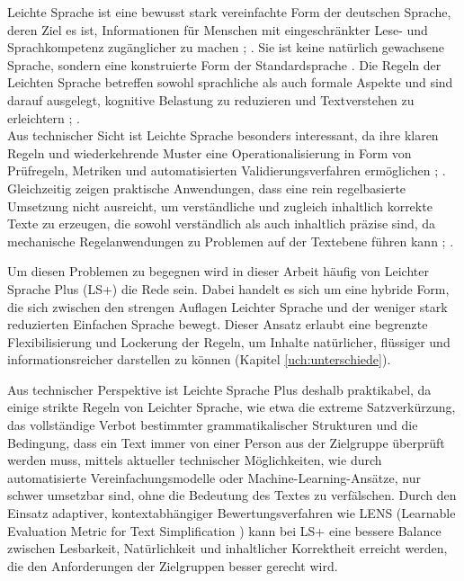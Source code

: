 
Leichte Sprache ist eine bewusst stark vereinfachte Form der deutschen Sprache, deren Ziel es ist, Informationen für Menschen mit eingeschränkter Lese- und Sprachkompetenz zugänglicher zu machen \cite{DINSPEC334292019}; \cite[S. 1]{maas_leichte_2015}.
Sie ist keine natürlich gewachsene Sprache, sondern eine konstruierte Form der Standardsprache \cite[S. 12]{maas_leichte_2015}.
Die Regeln der Leichten Sprache betreffen sowohl sprachliche als auch formale Aspekte und sind darauf ausgelegt, kognitive Belastung zu reduzieren und Textverstehen zu erleichtern \cite[S. 11-14]{maas_leichte_2015}; \cite[S. 251]{maas_handbuch_2018}.\\
Aus technischer Sicht ist Leichte Sprache besonders interessant, da ihre klaren Regeln und wiederkehrende Muster eine Operationalisierung in Form von Prüfregeln, Metriken und automatisierten Validierungsverfahren ermöglichen \cite[S. 584]{maas_handbuch_2018}; \cite[S. 162-163]{maas_leichte_2015}.
Gleichzeitig zeigen praktische Anwendungen, dass eine rein regelbasierte Umsetzung nicht ausreicht, um verständliche und zugleich inhaltlich korrekte Texte zu erzeugen, die sowohl verständlich als auch inhaltlich präzise sind, da mechanische Regelanwendungen zu Problemen auf der Textebene führen kann \cite[S. 277]{maas_handbuch_2018}; \cite[S. 291-292]{maas_handbuch_2018}.

Um diesen Problemen zu begegnen wird in dieser Arbeit häufig von Leichter Sprache Plus (LS+) die Rede sein.
Dabei handelt es sich um eine hybride Form, die sich zwischen den strengen Auflagen Leichter Sprache und der weniger stark reduzierten Einfachen Sprache bewegt.
Dieser Ansatz erlaubt eine begrenzte Flexibilisierung und Lockerung der Regeln, um Inhalte natürlicher, flüssiger und informationsreicher darstellen zu können (Kapitel \ref{uch:unterschiede}).

Aus technischer Perspektive ist Leichte Sprache Plus deshalb praktikabel, da einige strikte Regeln von Leichter Sprache, wie etwa die extreme Satzverkürzung, das vollständige Verbot bestimmter grammatikalischer Strukturen und die Bedingung, dass ein Text immer von einer Person aus der Zielgruppe überprüft werden muss, mittels aktueller technischer Möglichkeiten, wie durch automatisierte Vereinfachungsmodelle oder Machine-Learning-Ansätze, nur schwer umsetzbar sind, ohne die Bedeutung des Textes zu verfälschen.
Durch den Einsatz adaptiver, kontextabhängiger Bewertungsverfahren wie LENS (Learnable Evaluation Metric for Text Simplification \cite{maddela_lens_2023}) kann bei LS+ eine bessere Balance zwischen Lesbarkeit, Natürlichkeit und inhaltlicher Korrektheit erreicht werden, die den Anforderungen der Zielgruppen besser gerecht wird.

